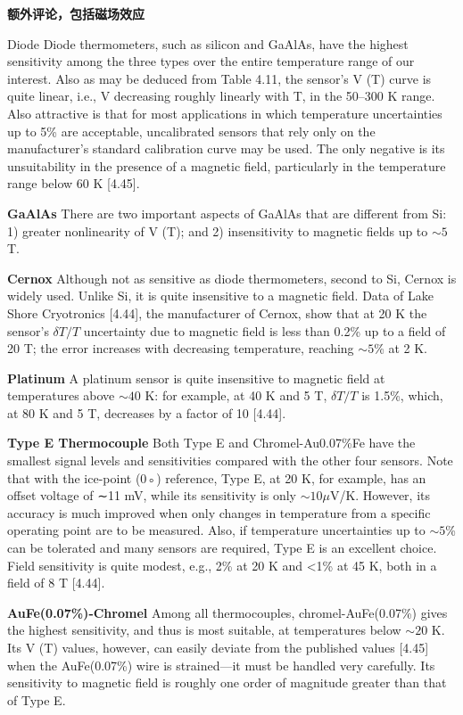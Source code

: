 \textbf{额外评论，包括磁场效应}

Diode Diode thermometers, such as silicon and GaAlAs, have the highest sensitivity among the three types over the entire temperature range of our interest.
Also as may be deduced from Table 4.11, the sensor’s V (T) curve is quite linear,
i.e., V decreasing roughly linearly with T, in the 50–300 K range. Also attractive is that for most applications in which temperature uncertainties up to 5\% are
acceptable, uncalibrated sensors that rely only on the manufacturer’s standard calibration curve may be used. The only negative is its unsuitability in the presence
of a magnetic field, particularly in the temperature range below 60 K [4.45].

\textbf{GaAlAs} There are two important aspects of GaAlAs that are different from Si:
1) greater nonlinearity of V (T); and 2) insensitivity to magnetic fields up to $\sim 5$ T.

\textbf{Cernox} Although not as sensitive as diode thermometers, second to Si, Cernox
is widely used. Unlike Si, it is quite insensitive to a magnetic field. Data of
Lake Shore Cryotronics [4.44], the manufacturer of Cernox, show that at 20 K the
sensor’s $\delta T/T$ uncertainty due to magnetic field is less than 0.2\% up to a field of
20 T; the error increases with decreasing temperature, reaching $\sim 5$\% at 2 K.

\textbf{Platinum} A platinum sensor is quite insensitive to magnetic field at temperatures above $\sim 40$ K: for example, at 40 K and 5 T, $\delta T/T$ is 1.5\%, which, at 80 K
and 5 T, decreases by a factor of 10 [4.44].

\textbf{Type E Thermocouple} Both Type E and Chromel-Au0.07\%Fe have the smallest signal levels and sensitivities compared with the other four sensors. Note that
with the ice-point (0◦) reference, Type E, at 20 K, for example, has an offset voltage of ∼11 mV, while its sensitivity is only  $\sim 10\mu$V/K. However, its accuracy is
much improved when only changes in temperature from a specific operating point
are to be measured. Also, if temperature uncertainties up to $\sim 5$\% can be tolerated
and many sensors are required, Type E is an excellent choice. Field sensitivity is
quite modest, e.g., 2\% at 20 K and <1\% at 45 K, both in a field of 8 T [4.44].

\textbf{AuFe(0.07\%)-Chromel} Among all thermocouples, chromel-AuFe(0.07\%) gives
the highest sensitivity, and thus is most suitable, at temperatures below $\sim 20$ K. Its
V (T) values, however, can easily deviate from the published values [4.45] when the
AuFe(0.07\%) wire is strained—it must be handled very carefully. Its sensitivity
to magnetic field is roughly one order of magnitude greater than that of Type E.

